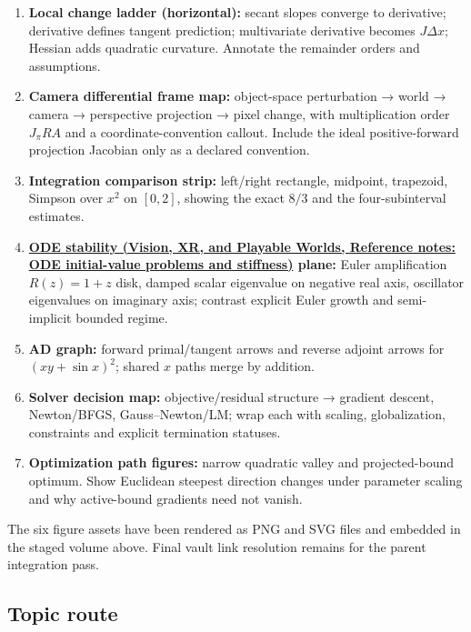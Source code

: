 \hypertarget{appendix-adf48f5dc5c1-figure-guide}{}

\begin{enumerate}
\def\labelenumi{\arabic{enumi}.}
\tightlist
\item
  \textbf{Local change ladder (horizontal):} secant slopes converge to derivative; derivative defines tangent prediction; multivariate derivative becomes \(J\Delta x\); Hessian adds quadratic curvature. Annotate the remainder orders and assumptions.
\item
  \textbf{Camera differential frame map:} object-space perturbation → world → camera → perspective projection → pixel change, with multiplication order \(J_\pi R A\) and a coordinate-convention callout. Include the ideal positive-forward projection Jacobian only as a declared convention.
\item
  \textbf{Integration comparison strip:} left/right rectangle, midpoint, trapezoid, Simpson over \(x^2\) on \([0,2]\), showing the exact \(8/3\) and the four-subinterval estimates.
\item
  \textbf{\href{../07-Vision-XR-and-Playable-Worlds/main.pdf\#nameddest=appendix-e8ab9836882e}{ODE stability (Vision, XR, and Playable Worlds, Reference notes: ODE initial-value problems and stiffness)} plane:} Euler amplification \(R(z)=1+z\) disk, damped scalar eigenvalue on negative real axis, oscillator eigenvalues on imaginary axis; contrast explicit Euler growth and semi-implicit bounded regime.
\item
  \textbf{AD graph:} forward primal/tangent arrows and reverse adjoint arrows for \((xy+\sin x)^2\); shared \(x\) paths merge by addition.
\item
  \textbf{Solver decision map:} objective/residual structure → gradient descent, Newton/BFGS, Gauss--Newton/LM; wrap each with scaling, globalization, constraints and explicit termination statuses.
\item
  \textbf{Optimization path figures:} narrow quadratic valley and projected-bound optimum. Show Euclidean steepest direction changes under parameter scaling and why active-bound gradients need not vanish.
\end{enumerate}

The six figure assets have been rendered as PNG and SVG files and embedded in the staged volume above. Final vault link resolution remains for the parent integration pass.

\subsection{Topic route}\label{appendix-adf48f5dc5c1-topic-route}

